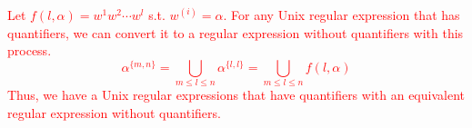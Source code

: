\textcolor{red}{
Let $f(l, \alpha) = w^1w^2 \cdots w^l$ s.t. $w^{(i)} = \alpha$.
For any Unix regular expression that has quantifiers, we can convert it to a regular expression without quantifiers with this process.
\[
    \alpha^{\{m,n\}}=\bigcup_{m\leq l \leq n}\alpha^{\{l,l\}}=\bigcup_{m\leq l \leq n}f(l, \alpha)
\]
Thus, we have a Unix regular expressions that have quantifiers with an equivalent regular expression without quantifiers.
}